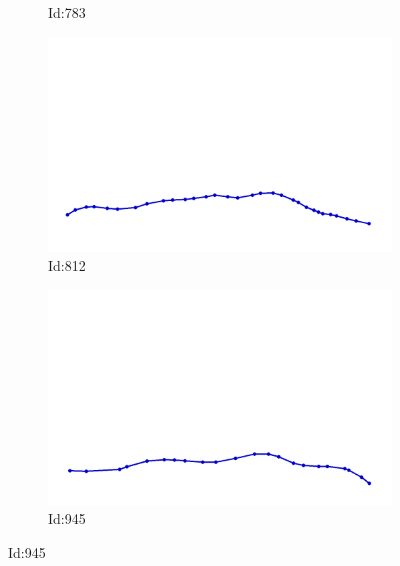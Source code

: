 \documentclass[12pt,twoside]{report}
\begin{document}
\begin{figure}
\begin{subfigure}[b]{0.20\textwidth}
\caption{Id:783}
\end{subfigure}
\begin{subfigure}[b]{0.20\textwidth}
\centering
\includegraphics[width=\textwidth]{../../trajectories/812.png}
\caption{Id:812}
\end{subfigure}
\begin{subfigure}[b]{0.20\textwidth}
\centering
\includegraphics[width=\textwidth]{../../trajectories/945.png}
\caption{Id:945}
\end{subfigure}
\end{figure}
\end{document}
